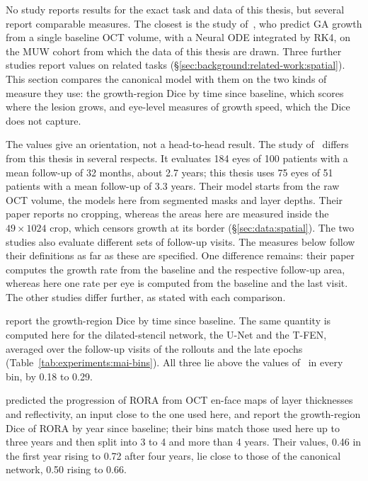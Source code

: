 No study reports results for the exact task and data of this thesis, but
several report comparable measures. The closest is the study
of~\citet{Mai2024}, who predict GA growth from a single baseline OCT
volume, with a Neural ODE integrated by RK4, on the MUW cohort from which
the data of this thesis are drawn. Three further studies report values on
related tasks (\S\ref{sec:background:related-work:spatial}). This section
compares the canonical model with them on the two kinds of measure they
use: the growth-region Dice by time since baseline, which scores where the
lesion grows, and eye-level measures of growth speed, which the Dice does
not capture.

The values give an orientation, not a head-to-head result. The study
of~\citet{Mai2024} differs from this thesis in several respects. It
evaluates 184 eyes of 100 patients with a mean follow-up of 32 months,
about 2.7 years; this thesis uses 75 eyes of 51 patients with a mean
follow-up of 3.3 years. Their model starts from the raw OCT volume, the
models here from segmented masks and layer depths. Their paper reports no
cropping, whereas the areas here are measured inside the
$49 \times 1024$ crop, which censors growth at its border
(\S\ref{sec:data:spatial}). The two studies also evaluate different sets of
follow-up visits. The measures below follow their definitions as far as
these are specified. One difference remains: their paper computes the
growth rate from the baseline and the respective follow-up area, whereas
here one rate per eye is computed from the baseline and the last visit. The
other studies differ further, as stated with each comparison.

\citet{Mai2024} report the growth-region Dice by time since baseline. The
same quantity is computed here for the dilated-stencil network, the U-Net
and the T-FEN, averaged over the follow-up visits of the rollouts and the
late epochs (Table~\ref{tab:experiments:mai-bins}). All three lie above the
values of~\citet{Mai2024} in every bin, by 0.18 to 0.29.

\citet{Gigon2021} predicted the progression of RORA from OCT en-face maps
of layer thicknesses and reflectivity, an input close to the one used here,
and report the growth-region Dice of RORA by year since baseline; their
bins match those used here up to three years and then split into 3 to 4
and more than 4 years. Their values, 0.46 in the first year rising to 0.72
after four years, lie close to those of the canonical network, 0.50 rising
to 0.66.

